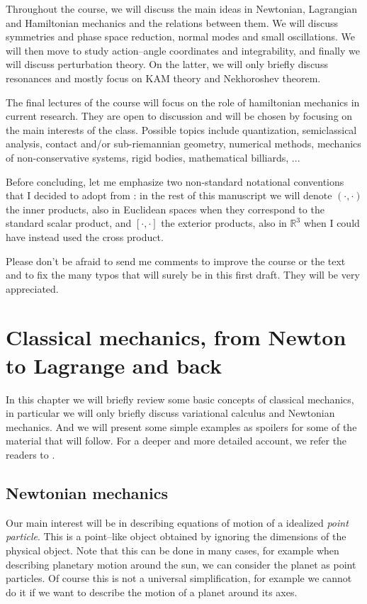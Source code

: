 \documentclass[english,fontsize=11pt,paper=a5,oneside]{scrbook}
\newcommand{\R}{\mathbb{R}}
\theoremstyle{definition}
\begin{document}
Throughout the course, we will discuss the main ideas in Newtonian, Lagrangian and Hamiltonian mechanics and the relations between them.
We will discuss symmetries and phase space reduction, normal modes and small oscillations.
We will then move to study action--angle coordinates and integrability, and finally we will discuss perturbation theory.
On the latter, we will only briefly discuss resonances and mostly focus on KAM theory and Nekhoroshev theorem.

The final lectures of the course will focus on the role of hamiltonian mechanics in current research. They are open to discussion and will be chosen by focusing on the main interests of the class. Possible topics include quantization, semiclassical analysis, contact and/or sub-riemannian geometry, numerical methods, mechanics of non-conservative systems, rigid bodies, mathematical billiards, ...

Before concluding, let me emphasize two non-standard notational conventions that I decided to adopt from \cite{book:arnold}: in the rest of this manuscript we will denote $(\cdot,\cdot)$ the inner products, also in Euclidean spaces when they correspond to the standard scalar product, and $[\cdot,\cdot]$ the exterior products, also in $\R^3$ when I could have instead used the cross product.

Please don't be afraid to send me comments to improve the course or the text and to fix the many typos that will surely be in this first draft. They will be very appreciated.

\chapter{Classical mechanics, from Newton to Lagrange and back}

In this chapter we will briefly review some basic concepts of classical mechanics, in particular we will only briefly discuss variational calculus and Newtonian mechanics.
And we will present some simple examples as spoilers for some of the material that will follow.
For a deeper and more detailed account, we refer the readers to \cite{book:arnold,book:knauf}.

\section{Newtonian mechanics}

Our main interest will be in describing equations of motion of a idealized \emph{point particle}.
This is a point--like object obtained by ignoring the dimensions of the physical object. Note that this can be done in many cases, for example when describing planetary motion around the sun, we can consider the planet as point particles.
Of course this is not a universal simplification, for example we cannot do it if we want to describe the motion of a planet around its axes.
\end{document}
